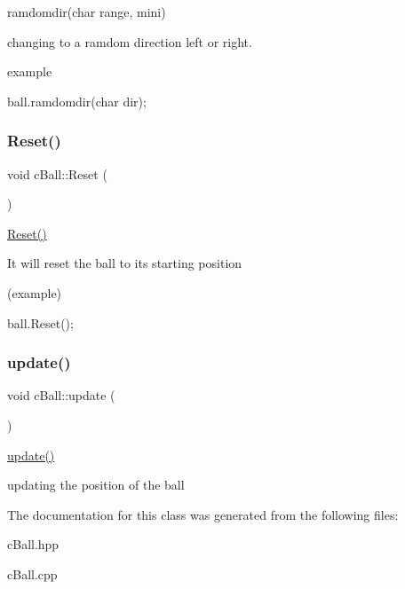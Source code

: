 ramdomdir(char range, mini) 

changing to a ramdom direction left or right.

\begin{DoxyParagraph}{example}

\begin{DoxyCode}
ball.ramdomdir(\textcolor{keywordtype}{char} dir);
\end{DoxyCode}
 
\end{DoxyParagraph}
\mbox{\label{classc_ball_a7c7b2cda898f6e1670faa2f753b9c420}} 
\subsubsection{\texorpdfstring{Reset()}{Reset()}}
{\footnotesize\ttfamily void c\+Ball\+::\+Reset (\begin{DoxyParamCaption}{ }\end{DoxyParamCaption})}



\mbox{\hyperlink{classc_ball_a7c7b2cda898f6e1670faa2f753b9c420}{Reset()}} 

It will reset the ball to its starting position

(example) 
\begin{DoxyCode}
ball.Reset();
\end{DoxyCode}
 \mbox{\label{classc_ball_acbdd0fa42ab6efd934d4966f3bf2e411}} 
\subsubsection{\texorpdfstring{update()}{update()}}
{\footnotesize\ttfamily void c\+Ball\+::update (\begin{DoxyParamCaption}{ }\end{DoxyParamCaption})}



\mbox{\hyperlink{classc_ball_acbdd0fa42ab6efd934d4966f3bf2e411}{update()}} 

updating the position of the ball 

The documentation for this class was generated from the following files\+:\begin{DoxyCompactItemize}
\item 
c\+Ball.\+hpp\item 
c\+Ball.\+cpp\end{DoxyCompactItemize}

